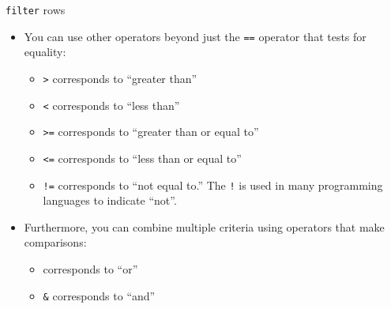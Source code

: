\documentclass[
  ignorenonframetext,
]{beamer}
\providecommand{\tightlist}{%
  \setlength{\itemsep}{0pt}\setlength{\parskip}{0pt}}
\begin{document}
\begin{frame}[fragile]{\texttt{filter} rows}
\protect\hypertarget{filter-rows-2}{}
\begin{itemize}
\item
  You can use other operators beyond just the \texttt{==} operator that
  tests for equality:

  \begin{itemize}
  \tightlist
  \item
    \texttt{\textgreater{}} corresponds to ``greater than''
  \item
    \texttt{\textless{}} corresponds to ``less than''
  \item
    \texttt{\textgreater{}=} corresponds to ``greater than or equal to''
  \item
    \texttt{\textless{}=} corresponds to ``less than or equal to''
  \item
    \texttt{!=} corresponds to ``not equal to.'' The \texttt{!} is used
    in many programming languages to indicate ``not''.
  \end{itemize}
\item
  Furthermore, you can combine multiple criteria using operators that
  make comparisons:

  \begin{itemize}
  \tightlist
  \item
    \texttt{\textbar{}} corresponds to ``or''
  \item
    \texttt{\&} corresponds to ``and''
  \end{itemize}
\end{itemize}
\end{frame}
\end{document}

